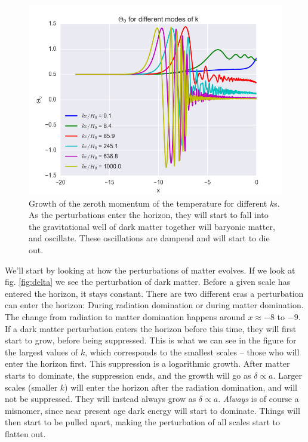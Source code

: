 \documentclass[a4paper,norsk, 10pt]{article}
\begin{document}
\begin{figure}[!htbp]
\centering
\includegraphics[scale=0.5]{Theta_0.png}
\caption{Growth of the zeroth momentum of the temperature for different $k$s. As the perturbations enter the horizon, they will start to fall into the gravitational well of dark matter together will baryonic matter, and oscillate. These oscillations are dampend and will start to die out.}\label{fig:theta}
\end{figure}




We'll start by looking at how the perturbations of matter evolves. If we look at fig. \ref{fig:delta} we see the perturbation of dark matter. Before a given scale has entered the horizon, it stays constant. There are two different eras a perturbation can enter the horizon: During radiation domination or during matter domination. The change from radiation to matter domination happens around $x\approx -8$ to $-9$. If a dark matter perturbation enters the horizon before this time, they will first start to grow, before being suppressed. This is what we can see in the figure for the largest values of $k$, which corresponds to the smallest scales -- those who will enter the horizon first. This suppression is a logarithmic growth. After matter starts to dominate, the suppression ends, and the growth will go as $\delta \propto a$. Larger scales (smaller $k$) will enter the horizon after the radiation domination, and will not be suppressed. They will instead always grow as $\delta \propto a$. \textit{Always} is of course a misnomer, since near present age dark energy will start to dominate. Things will then start to be pulled apart, making the perturbation of all scales start to flatten out. 
\end{document}
